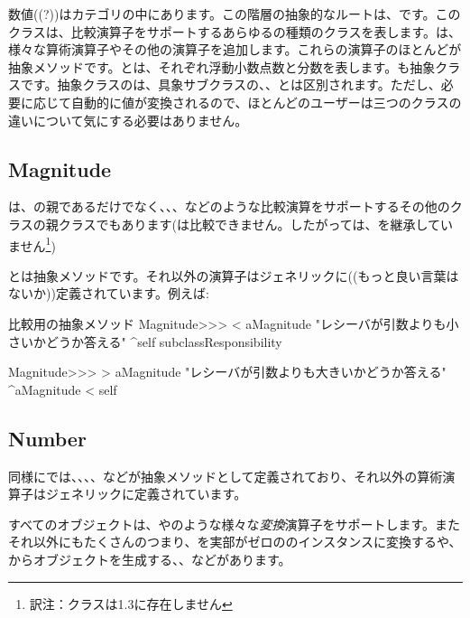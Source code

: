 \documentclass[a4paper,10pt,twoside]{book}
\begin{document}
数値((?))はカテゴリの中にあります。この階層の抽象的なルートは、です。このクラスは、比較演算子をサポートするあらゆるの種類のクラスを表します。は、様々な算術演算子やその他の演算子を追加します。これらの演算子のほとんどが抽象メソッドです。とは、それぞれ浮動小数点数と分数を表します。も抽象クラスです。抽象クラスのは、具象サブクラスの、、とは区別されます。ただし、必要に応じて自動的に値が変換されるので、ほとんどのユーザーは三つのクラスの違いについて気にする必要はありません。

\subsection{Magnitude}

は、の親であるだけでなく、、、などのような比較演算をサポートするその他のクラスの親クラスでもあります(は比較できません。したがっては、を継承していません\footnote{訳注：クラスは\pharo 1.3に存在しません})

とは抽象メソッドです。それ以外の演算子はジェネリックに((もっと良い言葉はないか))定義されています。例えば:

\begin{method}{比較用の抽象メソッド}
Magnitude>>> < aMagnitude 
    "レシーバが引数よりも小さいかどうか答える"
    ^self subclassResponsibility

Magnitude>>> > aMagnitude 
    "レシーバが引数よりも大きいかどうか答える"
    ^aMagnitude < self
\end{method}

\subsection{Number}

同様にでは、、、、などが抽象メソッドとして定義されており、それ以外の算術演算子はジェネリックに定義されています。

すべてのオブジェクトは、やのような様々な\emph{変換}演算子をサポートします。またそれ以外にもたくさんのつまり、を実部がゼロののインスタンスに変換するや、からオブジェクトを生成する、、などがあります。
\end{document}
